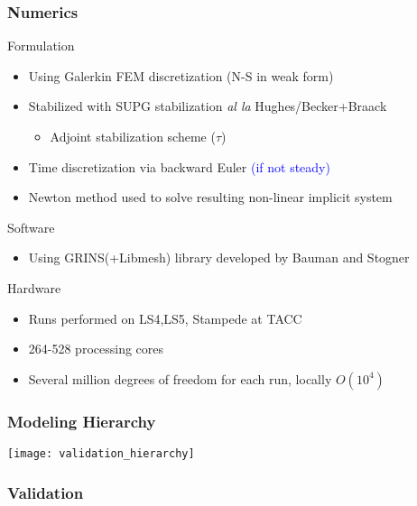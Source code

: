 \documentclass[mathserif]{beamer}
\begin{document}
%
%
%
\begin{frame}
  \frametitle{Numerics}
  \begin{block}{Formulation}
    \begin{itemize}
    \item Using Galerkin FEM discretization (N-S in weak form)
    \item Stabilized with SUPG stabilization \textit{al la} Hughes/Becker+Braack
      \begin{itemize}
      \item Adjoint stabilization scheme ($\tau$)
      \end{itemize}
    \item Time discretization via backward Euler \textcolor{blue}{(if not steady)}
    \item Newton method used to solve resulting non-linear implicit system
    \end{itemize}
  \end{block}

  \begin{block}{Software}
    \begin{itemize}
    \item Using GRINS(+Libmesh) library developed by Bauman and Stogner
    \end{itemize}
  \end{block}

  \begin{block}{Hardware}
    \begin{itemize}
    \item Runs performed on LS4,LS5, Stampede at TACC
    \item 264-528 processing cores
    \item Several million degrees of freedom for each run, locally $O(10^4)$ 
    \end{itemize}
  \end{block}

\end{frame}


%
%
%
\begin{frame}
  \frametitle{Modeling Hierarchy}

    \begin{center}
    \texttt{[image: validation\_hierarchy]}
   \end{center}

\end{frame}

%
%
%
\begin{frame}
 \frametitle{Validation}


\end{frame}
\end{document}
